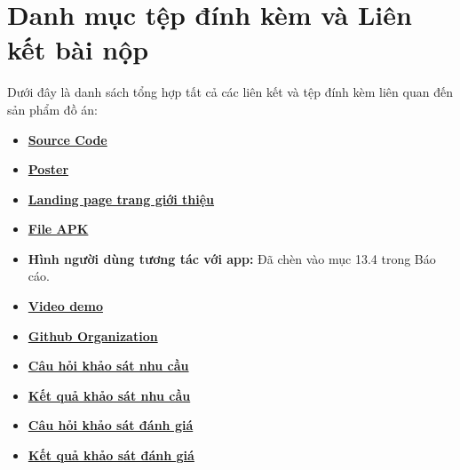 \section*{Danh mục tệp đính kèm và Liên kết bài nộp}

Dưới đây là danh sách tổng hợp tất cả các liên kết và tệp đính kèm liên quan đến sản phẩm đồ án:

\begin{itemize}
    \item \href{https://github.com/L02-Ch-a-tay-dau/Tinner}{\textbf{Source Code}}
    \item \href{https://drive.google.com/file/d/1AspbPSsy4zN6DoGebQvaGiBlPx7S1c5W/view?usp=drive_link}{\textbf{Poster}}
    \item \href{https://tinner-landing.vercel.app}{\textbf{Landing page trang giới thiệu}}
    \item \href{https://drive.google.com/file/d/1w1e8SFMjvCyyXSSihyVXFBn4zIxYl6Fn/view?usp=drive_link}{\textbf{File APK}}
    \item \textbf{Hình người dùng tương tác với app:} Đã chèn vào mục 13.4 trong Báo cáo.
    \item \href{https://drive.google.com/file/d/1WgW-viQ2h3a8GcF7ztx-l3KV6WENd5tP/view?usp=drive_link}{\textbf{Video demo}}
    \item \href{https://github.com/L02-Ch-a-tay-dau}{\textbf{Github Organization}}
    \item \href{https://docs.google.com/forms/d/e/1FAIpQLSfnEMLKIJ9z5r32EnKIaMPPjrqn6PBxrZVBOm-WXIaxdOLFZg/viewform?usp=dialog}{\textbf{Câu hỏi khảo sát nhu cầu}}
    \item \href{https://docs.google.com/spreadsheets/d/1UfnKclMpH5f_9CCyRv-eyoiFY-97xmh4rrFONMrj5MQ/edit?usp=sharing}{\textbf{Kết quả khảo sát nhu cầu}}
    \item \href{https://docs.google.com/forms/d/e/1FAIpQLScH6LtpMuT4VH5joukmBGSL-LDGqbamjlV4-HUr_WysXYcfVg/viewform?usp=dialog}{\textbf{Câu hỏi khảo sát đánh giá}}
    \item \href{https://docs.google.com/spreadsheets/d/1_LiDekz8EGwzIS1IXU3K8V60mTbjadKK53dnk8Xul1s/edit?usp=sharing}{\textbf{Kết quả khảo sát đánh giá}}
\end{itemize}

\newpage
